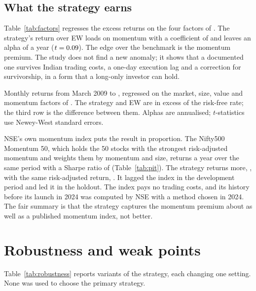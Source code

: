 \documentclass[11pt]{article}
\begin{document}
\subsection{What the strategy earns}

Table~\ref{tab:factors} regresses the excess returns on the four factors of
\citet{agarwalla2013}. The strategy's return over EW loads on momentum with a
coefficient of \PitWml{} and leaves an alpha of \PitFactorAlpha{} a year
($t = 0.09$). The edge over the benchmark is the momentum premium. The
study does not find a new anomaly; it shows that a documented one survives Indian
trading costs, a one-day execution lag and a correction for survivorship, in a form
that a long-only investor can hold.

\begin{table}[!htbp]
\centering
\caption{Four-factor attribution on the survivorship-free universe}
\label{tab:factors}
\small

\begin{tablenote}
Monthly returns from March 2009 to \FactorEnd, regressed on the market, size, value
and momentum factors of \citet{agarwalla2013}. The strategy and EW are in excess of
the risk-free rate; the third row is the difference between them. Alphas are
annualised; $t$-statistics use Newey-West standard errors.
\end{tablenote}
\end{table}

NSE's own momentum index puts the result in proportion. The Nifty500 Momentum 50,
which holds the 50 stocks with the strongest risk-adjusted momentum and weights them
by momentum and size, returns \PitMomCagrFull{} a year over the same period with a
Sharpe ratio of \PitMomSharpeFull{} (Table~\ref{tab:pit}). The strategy returns
more, \PitCagrFull, with the same risk-adjusted return, \PitSharpeFull. It lagged the
index in the development period and led it in the holdout. The index pays no trading
costs, and its history before its launch in 2024 was computed by NSE with a method
chosen in 2024. The fair summary is that the strategy captures the momentum premium
about as well as a published momentum index, not better.

\section{Robustness and weak points}\label{sec:weak}

Table~\ref{tab:robustness} reports variants of the strategy, each changing one
setting. None was used to choose the primary strategy.
\end{document}
